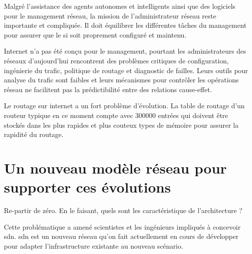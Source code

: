 Malgré l'assistance des agents autonomes et intelligents ainsi que des logiciels pour le management réseau, la mission de l'administrateur réseau reste importante et compliquée. Il doit équilibrer les différentes tâches du management pour assurer que le \gls{si} soit proprement configuré et maintenu. \cite{CentralIssuesNetworkManagementConclusion}

Internet n'a pas été conçu pour le management, pourtant les administrateurs des réseaux d'aujourd'hui rencontrent des problèmes critiques de configuration, ingénierie du trafic, politique de routage et diagnostic de failles. Leurs outils pour analyse du trafic sont faibles et leurs mécanismes pour contrôler les opérations réseau ne facilitent pas la prédictibilité entre des relations cause-effet.

Le routage sur internet a un fort problème d'évolution. La table de routage d'un routeur typique en ce moment compte avec 300000 entrées qui doivent être stockés dans les plus rapides et plus couteux types de mémoire pour assurer la rapidité du routage.


\section{Un nouveau modèle réseau pour supporter ces évolutions}

Re-partir de zéro. En le faisant, quels sont les caractéristique de l'architecture ?


Cette problématique a amené scientistes et les ingénieurs impliqués à concevoir \gls{sdn}. \gls{sdn} est un nouveau  réseau qu'on fait actuellement en cours de développer pour adapter l'infrastructure existante au nouveau scénario.


